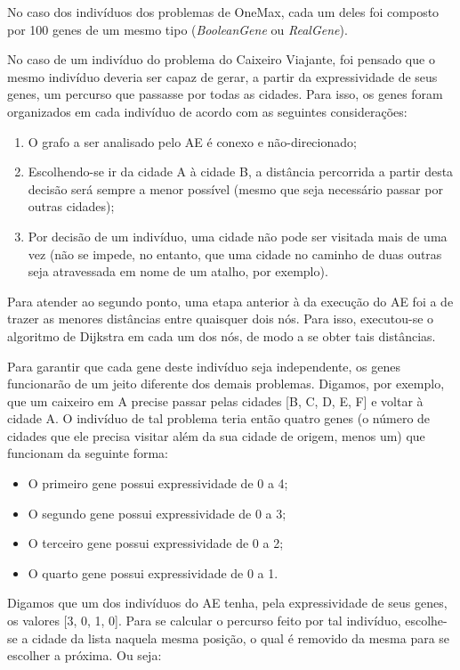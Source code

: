 No caso dos indivíduos dos problemas de OneMax, cada um deles foi composto por 100 genes de um mesmo tipo (\textit{BooleanGene} ou \textit{RealGene}).

No caso de um indivíduo do problema do Caixeiro Viajante, foi pensado que o mesmo indivíduo deveria ser capaz de gerar, a partir da expressividade de seus genes, um percurso que passasse por todas as cidades. Para isso, os genes foram organizados em cada indivíduo de acordo com as seguintes considerações:

\begin{enumerate}[label={(\arabic*)}]
	\item O grafo a ser analisado pelo AE é conexo e não-direcionado;
	\item Escolhendo-se ir da cidade A à cidade B, a distância percorrida a partir desta decisão será sempre a menor possível (mesmo que seja necessário passar por outras cidades);
	\item Por decisão de um indivíduo, uma cidade não pode ser visitada mais de uma vez (não se impede, no entanto, que uma cidade no caminho de duas outras seja atravessada em nome de um atalho, por exemplo).
\end{enumerate}

Para atender ao segundo ponto, uma etapa anterior à da execução do AE foi a de trazer as menores distâncias entre quaisquer dois nós. Para isso, executou-se o algoritmo de Dijkstra em cada um dos nós, de modo a se obter tais distâncias.

Para garantir que cada gene deste indivíduo seja independente, os genes funcionarão de um jeito diferente dos demais problemas. Digamos, por exemplo, que um caixeiro em A precise passar pelas cidades [B, C, D, E, F] e voltar à cidade A. O indivíduo de tal problema teria então quatro genes (o número de cidades que ele precisa visitar além da sua cidade de origem, menos um) que funcionam da seguinte forma:

\begin{itemize}
	\item O primeiro gene possui expressividade de 0 a 4;
	\item O segundo gene possui expressividade de 0 a 3;
	\item O terceiro gene possui expressividade de 0 a 2;
	\item O quarto gene possui expressividade de 0 a 1.
\end{itemize}

Digamos que um dos indivíduos do AE tenha, pela expressividade de seus genes, os valores [3, 0, 1, 0]. Para se calcular o percurso feito por tal indivíduo, escolhe-se a cidade da lista naquela mesma posição, o qual é removido da mesma para se escolher a próxima. Ou seja:

